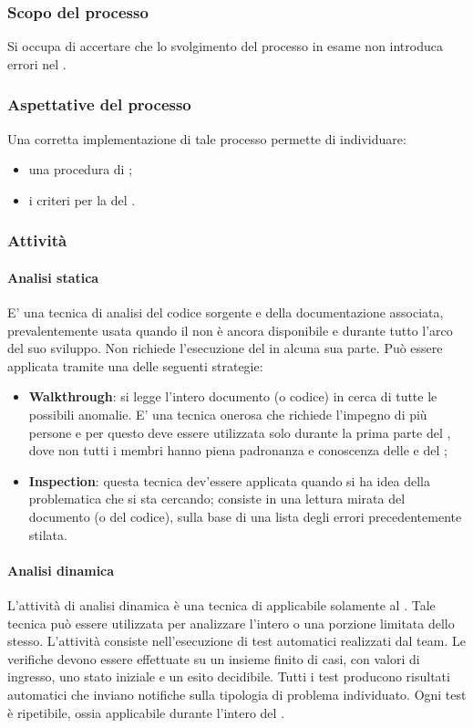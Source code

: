 \subsubsection{Scopo del processo}
Si occupa di accertare che lo svolgimento del processo in esame non introduca errori nel .
\subsubsection{Aspettative del processo}
Una corretta implementazione di tale processo permette di individuare:
\begin{itemize}
	\item una procedura di ;
	\item i criteri per la  del .
\end{itemize}
\subsubsection{Attività}
 \paragraph{Analisi statica}
E' una tecnica di analisi del codice sorgente e della documentazione associata, prevalentemente
usata quando il  non è ancora disponibile e durante tutto l'arco del suo sviluppo. Non
richiede l'esecuzione del   in alcuna sua parte. Può essere applicata tramite una
delle seguenti strategie:
\begin{itemize}
	\item \textbf{Walkthrough}: si legge l'intero documento (o codice) in cerca di tutte le possibili anomalie. E' una tecnica onerosa che richiede l'impegno di più persone e per questo deve essere utilizzata solo durante la prima parte del , dove non tutti i membri hanno piena padronanza e conoscenza delle \NPdoc e del \PQdoc;
	\item \textbf{Inspection}: questa tecnica dev'essere applicata quando si ha idea della
problematica che si sta cercando; consiste in una lettura mirata del
documento (o del codice), sulla base di una lista degli errori precedentemente
stilata.
\end{itemize}
 \paragraph{Analisi dinamica}
L'attività di analisi dinamica è una tecnica di  applicabile solamente al . Tale tecnica può essere utilizzata per analizzare l'intero  o una
porzione limitata dello stesso. L'attività consiste nell'esecuzione di test automatici realizzati
dal team. Le verifiche devono essere effettuate su un insieme finito di casi, con valori di
ingresso, uno stato iniziale e un esito decidibile. Tutti i test producono risultati automatici
che inviano notifiche sulla tipologia di problema individuato. Ogni test è ripetibile, ossia
applicabile durante l'intero  del .
